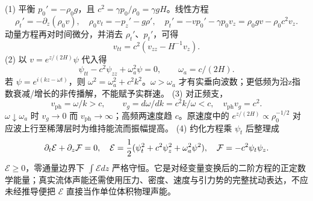 (1) 平衡 \(p_0'=-\rho_0g\)，且 \(c^2=\gamma p_0/\rho_0=\gamma gH\)。线性方程
\[
\rho_t'=-\partial_z(\rho_0v),\quad
\rho_0v_t=-p_z'-g\rho',\quad
p_t'=-vp_0'-\gamma p_0v_z=\rho_0gv-\rho_0c^2v_z .
\]
动量方程再对时间微分，并消去 \(\rho_t'\)、\(p_t'\)，可得
\[
v_{tt}=c^2(v_{zz}-H^{-1}v_z).
\]
(2) 以 \(v=e^{z/(2H)}\psi\) 代入得
\[
\psi_{tt}-c^2\psi_{zz}+\omega_a^2\psi=0,\qquad
\omega_a=c/(2H).
\]
若 \(\psi=e^{i(kz-\omega t)}\)，则 \(\omega^2=\omega_a^2+c^2k^2\)。\(\omega>\omega_a\) 才有实垂向波数；更低频为沿z指数衰减/增长的非传播解，不能赋予实群速。
(3) 对正频支，
\[
v_\mathrm{ph}=\omega/k>c,\qquad
v_g=d\omega/dk=c^2k/\omega<c,\quad v_\mathrm{ph}v_g=c^2.
\]
\(\omega\downarrow\omega_a\) 时 \(v_g\to0\) 而 \(v_\mathrm{ph}\to\infty\)；高频两速度趋 \(c\)。原速度中的 \(e^{z/(2H)}\propto\rho_0^{-1/2}\) 对应波上行至稀薄层时为维持能流而振幅提高。
(4) 约化方程乘 \(\psi_t\) 后整理成
\[
\partial_t\mathcal E+\partial_z\mathcal F=0,\quad
\mathcal E={1\over2}(\psi_t^2+c^2\psi_z^2+\omega_a^2\psi^2),\quad
\mathcal F=-c^2\psi_t\psi_z.
\]
\(\mathcal E\ge0\)，零通量边界下 \(\int\mathcal E dz\) 严格守恒。它是对经变量变换后的二阶方程的正定数学能量；真实流体声能还需使用压力、密度、速度与引力势的完整扰动表达，不应未经推导便把 \(\mathcal E\) 直接当作单位体积物理声能。
